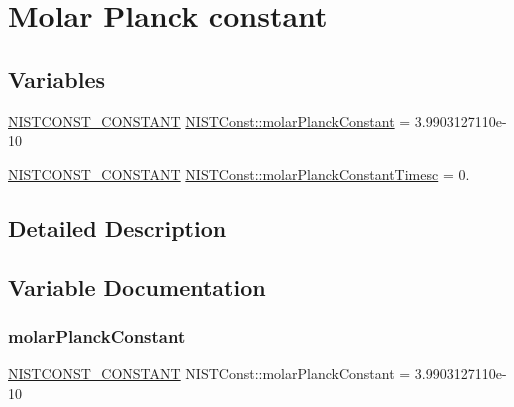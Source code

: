 \hypertarget{group___n_i_s_t_const-_molar_planck_constant}{}\section{Molar Planck constant}
\label{group___n_i_s_t_const-_molar_planck_constant}
\subsection*{Variables}
\begin{DoxyCompactItemize}
\item 
\mbox{\hyperlink{group___n_i_s_t_const-_macros_ga2b0fc1d7452373f816175dd86ce26729}{N\+I\+S\+T\+C\+O\+N\+S\+T\+\_\+\+C\+O\+N\+S\+T\+A\+NT}} \mbox{\hyperlink{group___n_i_s_t_const-_molar_planck_constant_ga5fc2f65abda1ed9e9431157c44da077a}{N\+I\+S\+T\+Const\+::molar\+Planck\+Constant}} = 3.\+9903127110e-\/10
\item 
\mbox{\hyperlink{group___n_i_s_t_const-_macros_ga2b0fc1d7452373f816175dd86ce26729}{N\+I\+S\+T\+C\+O\+N\+S\+T\+\_\+\+C\+O\+N\+S\+T\+A\+NT}} \mbox{\hyperlink{group___n_i_s_t_const-_molar_planck_constant_ga79708a6d196bdd250c5e965eb857a786}{N\+I\+S\+T\+Const\+::molar\+Planck\+Constant\+Timesc}} = 0.
\end{DoxyCompactItemize}


\subsection{Detailed Description}


\subsection{Variable Documentation}
\mbox{\label{group___n_i_s_t_const-_molar_planck_constant_ga5fc2f65abda1ed9e9431157c44da077a}} 
\subsubsection{\texorpdfstring{molar\+Planck\+Constant}{molarPlanckConstant}}
{\footnotesize\ttfamily \mbox{\hyperlink{group___n_i_s_t_const-_macros_ga2b0fc1d7452373f816175dd86ce26729}{N\+I\+S\+T\+C\+O\+N\+S\+T\+\_\+\+C\+O\+N\+S\+T\+A\+NT}} N\+I\+S\+T\+Const\+::molar\+Planck\+Constant = 3.\+9903127110e-\/10}

